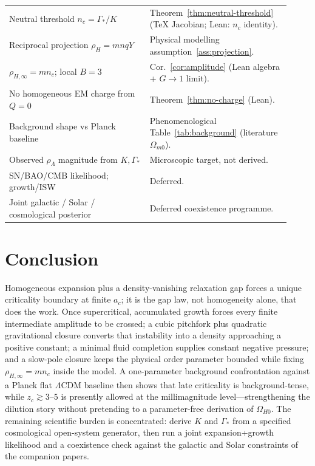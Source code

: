 \documentclass[11pt]{article}
\theoremstyle{definition}
\theoremstyle{remark}
\begin{document}
\begin{center}
\begin{tabular}{@{}p{0.46\linewidth}p{0.46\linewidth}@{}}
Neutral threshold $n_c=\Gamma_*/K$ & Theorem~\ref{thm:neutral-threshold} (TeX Jacobian; Lean: $n_c$ identity).\\
Reciprocal projection $\rho_H=mnqY$ & Physical modelling assumption~\ref{ass:projection}.\\
$\rho_{H,\infty}=mn_c$; local $B=3$ & Cor.~\ref{cor:amplitude} (Lean algebra + $G\to1$ limit).\\
No homogeneous EM charge from $Q=0$ & Theorem~\ref{thm:no-charge} (Lean).\\
Background shape vs Planck baseline & Phenomenological Table~\ref{tab:background} (literature $\Omega_{m0}$).\\
Observed $\rho_\Lambda$ magnitude from $K,\Gamma_*$ & Microscopic target, not derived.\\
SN/BAO/CMB likelihood; growth/ISW & Deferred.\\
Joint galactic / Solar / cosmological posterior & Deferred coexistence programme.\\
\bottomrule
\end{tabular}
\end{center}

\section{Conclusion}
\label{sec:conclusion}
Homogeneous expansion plus a density-vanishing relaxation gap forces a unique criticality boundary at finite $a_c$; it is the gap law, not homogeneity alone, that does the work.
Once supercritical, accumulated growth forces every finite intermediate amplitude to be crossed; a cubic pitchfork plus quadratic gravitational closure converts that instability into a density approaching a positive constant; a minimal fluid completion supplies constant negative pressure; and a slow-pole closure keeps the physical order parameter bounded while fixing $\rho_{H,\infty}=m n_c$ inside the model.
A one-parameter background confrontation against a Planck flat $\Lambda$CDM baseline then shows that late criticality is background-tense, while $z_c\gtrsim3$--$5$ is presently allowed at the millimagnitude level---strengthening the dilution story without pretending to a parameter-free derivation of $\Omega_{H0}$.
The remaining scientific burden is concentrated: derive $K$ and $\Gamma_*$ from a specified cosmological open-system generator, then run a joint expansion+growth likelihood and a coexistence check against the galactic and Solar constraints of the companion papers.



\end{document}
